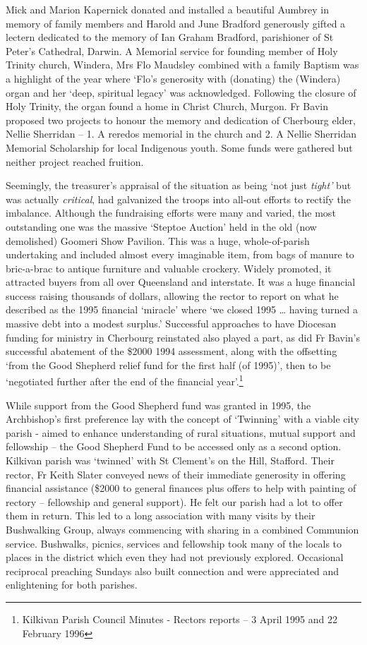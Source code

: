 Mick and Marion Kapernick donated and installed a beautiful Aumbrey in memory of family members and Harold and June Bradford generously gifted a lectern dedicated to the memory of Ian Graham Bradford, parishioner of St Peter's Cathedral, Darwin. A Memorial service for founding member of Holy Trinity church, Windera, Mrs Flo Maudsley combined with a family Baptism was a highlight of the year where `Flo's generosity with (donating) the (Windera) organ and her `deep, spiritual legacy' was acknowledged. Following the closure of Holy Trinity, the organ found a home in Christ Church, Murgon. Fr Bavin proposed two projects to honour the memory and dedication of Cherbourg elder, Nellie Sherridan -- 1. A reredos memorial in the church and 2. A Nellie Sherridan Memorial Scholarship for local Indigenous youth. Some funds were gathered but neither project reached fruition.

Seemingly, the treasurer's appraisal of the situation as being `not just \emph{tight'} but was actually \emph{critical}, had galvanized the troops into all-out efforts to rectify the imbalance. Although the fundraising efforts were many and varied, the most outstanding one was the massive `Steptoe Auction' held in the old (now demolished) Goomeri Show Pavilion. This was a huge, whole-of-parish undertaking and included almost every imaginable item, from bags of manure to bric-a-brac to antique furniture and valuable crockery. Widely promoted, it attracted buyers from all over Queensland and interstate. It was a huge financial success raising thousands of dollars, allowing the rector to report on what he described as the 1995 financial `miracle' where `we closed 1995 \ldots{} having turned a massive debt into a modest surplus.' Successful approaches to have Diocesan funding for ministry in Cherbourg reinstated also played a part, as did Fr Bavin's successful abatement of the \$2000 1994 assessment, along with the offsetting `from the Good Shepherd relief fund for the first half (of 1995)', then to be `negotiated further after the end of the financial year'.\footnote{Kilkivan Parish Council Minutes - Rectors reports -- 3 April 1995 and 22 February 1996}

While support from the Good Shepherd fund was granted in 1995, the Archbishop's first preference lay with the concept of `Twinning' with a viable city parish - aimed to enhance understanding of rural situations, mutual support and fellowship -- the Good Shepherd Fund to be accessed only as a second option. Kilkivan parish was `twinned' with St Clement's on the Hill, Stafford. Their rector, Fr Keith Slater conveyed news of their immediate generosity in offering financial assistance (\$2000 to general finances plus offers to help with painting of rectory -- fellowship and general support). He felt our parish had a lot to offer them in return. This led to a long association with many visits by their Bushwalking Group, always commencing with sharing in a combined Communion service. Bushwalks, picnics, services and fellowship took many of the locals to places in the district which even they had not previously explored. Occasional reciprocal preaching Sundays also built connection and were appreciated and enlightening for both parishes.

